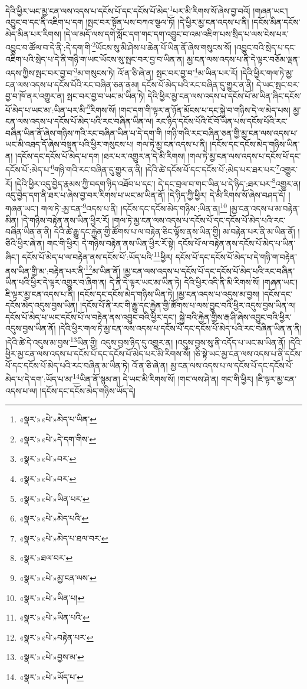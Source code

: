 དེའི་ཕྱིར་ཡང་མྱ་ངན་ལས་འདས་པ་དངོས་པོ་དང་དངོས་པོ་མེད་\footnote{«སྣར་»«པེ་»མེད་པ་ཡིན་}པར་མི་རིགས་སོ་ཞེས་བྱ་བའོ། །གཞན་ཡང་། འབྱུང་བ་དང་ནི་འཇིག་པ་དག །སྤང་བར་སྟོན་པས་བཀའ་སྩལ་ཏོ། །དེ་ཕྱིར་མྱ་ངན་འདས་པ་ནི། །དངོས་མིན་དངོས་མེད་མིན་པར་རིགས། །དེ་ལ་མདོ་ལས་དགེ་སློང་དག་གང་དག་འབྱུང་བ་འམ་འཇིག་པས་སྲིད་པ་ལས་ངེས་པར་འབྱུང་བ་ཚོལ་བ་དེ་ནི་:དེ་དག་གི་\footnote{«སྣར་»«པེ་»དེ་དག་གིས་}ཡོངས་སུ་མི་ཤེས་པ་ཆེན་པོ་ཡིན་ནོ་ཞེས་གསུངས་སོ། །འབྱུང་བའི་སྲེད་པ་དང་འཇིག་པའི་སྲེད་པ་དེ་ནི་གཉི་ག་ཡང་ཡོངས་སུ་སྤང་བར་བྱ་བ་ཡིན་ན། མྱ་ངན་ལས་འདས་པ་ནི་དེ་ལྟར་བཅོམ་ལྡན་འདས་ཀྱིས་སྤང་བར་བྱ་བ་\footnote{«སྣར་»«པེ་»བར་}མ་གསུངས་ཏེ། འོ་ན་ཅི་ཞེ་ན། སྤང་བར་བྱ་བ་\footnote{«སྣར་»«པེ་»བར་}མ་ཡིན་པར་རོ། །དེའི་ཕྱིར་གལ་ཏེ་མྱ་ངན་ལས་འདས་པ་དངོས་པོའི་རང་བཞིན་ཅན་ནམ། དངོས་པོ་མེད་པའི་རང་བཞིན་དུ་གྱུར་ན་ནི། དེ་ཡང་སྤང་བར་བྱ་བ་ཁོ་ནར་འགྱུར་ན། སྤང་བར་བྱ་བ་ཡང་མ་ཡིན་ཏེ། དེའི་ཕྱིར་མྱ་ངན་ལས་འདས་པ་དངོས་པོ་མ་ཡིན་ཞིང་དངོས་པོ་མེད་པ་ཡང་མ་:ཡིན་པར་མི་\footnote{«སྣར་»«པེ་»ཡིན་པར་}རིགས་སོ། །གང་དག་གི་ལྟར་ན་ཉོན་མོངས་པ་དང་སྐྱེ་བ་གཉིས་དེ་ལ་མེད་པས། མྱ་ངན་ལས་འདས་པ་དངོས་པོ་མེད་པའི་རང་བཞིན་ཡིན་ལ། རང་ཉིད་དངོས་པོའི་ངོ་བོ་ཡིན་པས་དངོས་པོའི་རང་བཞིན་ཡིན་ནོ་ཞེས་གཉིས་ཀའི་རང་བཞིན་ཡིན་པ་དེ་དག་གི །གཉི་གའི་རང་བཞིན་ཅན་གྱི་མྱ་ངན་ལས་འདས་པ་ཡང་མི་འཐད་དོ་ཞེས་བསྟན་པའི་ཕྱིར་གསུངས་པ། གལ་ཏེ་མྱ་ངན་འདས་པ་ནི། །དངོས་དང་དངོས་མེད་གཉིས་ཡིན་ན། །དངོས་དང་དངོས་པོ་མེད་པ་དག །ཐར་པར་འགྱུར་ན་དེ་མི་རིགས། །གལ་ཏེ་མྱ་ངན་ལས་འདས་པ་དངོས་པོ་དང་དངོས་པོ་:མེད་པ་\footnote{«སྣར་»«པེ་»མེད་པའི་}གཉི་གའི་རང་བཞིན་དུ་གྱུར་ན་ནི། །དེའི་ཚེ་དངོས་པོ་དང་དངོས་པོ་:མེད་པར་ཐར་པར་\footnote{«སྣར་»«པེ་»མེད་པ་ཐལ་བར་}འགྱུར་རོ། །དེའི་ཕྱིར་འདུ་བྱེད་རྣམས་ཀྱི་བདག་ཉིད་འཐོབ་པ་དང་། དེ་དང་བྲལ་བ་གང་ཡིན་པ་དེ་ཉིད་:ཐར་པར་\footnote{«སྣར་»ཐལ་བར་}འགྱུར་ན། འདུ་བྱེད་དག་ནི་ཐར་པ་ཞེས་བྱ་བར་རིགས་པ་ཡང་མ་ཡིན་ནོ། །དེ་ཉིད་ཀྱི་ཕྱིར། དེ་མི་རིགས་སོ་ཞེས་བཤད་དོ། །གཞན་ཡང་། གལ་ཏེ་:མྱ་ངན་\footnote{«སྣར་»«པེ་»མྱ་ངན་ལས་}འདས་པ་ནི། །དངོས་དང་དངོས་མེད་གཉིས་:ཡིན་ན།\footnote{«སྣར་»«པེ་»ཡིན་པ།} །མྱ་ངན་འདས་པ་མ་བརྟེན་མིན། །དེ་གཉིས་བརྟེན་ནས་ཡིན་ཕྱིར་རོ། །གལ་ཏེ་མྱ་ངན་ལས་འདས་པ་དངོས་པོ་དང་དངོས་པོ་མེད་པའི་རང་བཞིན་ཡིན་ན་ནི། དེའི་ཚེ་རྒྱུ་དང་རྐྱེན་གྱི་ཚོགས་པ་ལ་བརྟེན་ཅིང་ལྟོས་ནས་ཡིན་གྱི། མ་བརྟེན་པར་ནི་མ་ཡིན་ནོ། །ཅིའི་ཕྱིར་ཞེ་ན། གང་གི་ཕྱིར། དེ་གཉིས་བརྟེན་ནས་ཡིན་ཕྱིར་རོ་སྟེ། དངོས་པོ་ལ་བརྟེན་ནས་དངོས་པོ་མེད་པ་ཡིན་ཞིང་། དངོས་པོ་མེད་པ་ལ་བརྟེན་ནས་དངོས་པོ་:ཡོད་པའི་\footnote{«སྣར་»«པེ་»ཡིན་པའི་}ཕྱིར། དངོས་པོ་དང་དངོས་པོ་མེད་པ་དེ་གཉི་ག་བརྟེན་ནས་ཡིན་གྱི་མ་:བརྟེན་པར་ནི་\footnote{«སྣར་»«པེ་»བརྟེན་པར་}མ་ཡིན་ནོ། །མྱ་ངན་ལས་འདས་པ་དངོས་པོ་དང་དངོས་པོ་མེད་པའི་རང་བཞིན་ཡིན་པའི་ཕྱིར་དེ་ལྟར་འགྱུར་བ་ཞིག་ན། དེ་ནི་དེ་ལྟར་ཡང་མ་ཡིན་ཏེ། དེའི་ཕྱིར་འདི་ནི་མི་རིགས་སོ། །གཞན་ཡང་། ཇི་ལྟར་མྱ་ངན་འདས་པ་ནི། །དངོས་དང་དངོས་མེད་གཉིས་ཡིན་ཏེ། །མྱ་ངན་འདས་པ་འདུས་མ་བྱས། །དངོས་དང་དངོས་མེད་འདུས་བྱས་ཡིན། །དངོས་པོ་ནི་རང་གི་རྒྱུ་དང་རྐྱེན་གྱི་ཚོགས་པ་ལས་བྱུང་བའི་ཕྱིར་འདུས་བྱས་ཡིན་ལ། དངོས་པོ་མེད་པ་ཡང་དངོས་པོ་ལ་བརྟེན་ནས་འབྱུང་བའི་ཕྱིར་དང་། སྐྱེ་བའི་རྐྱེན་གྱིས་རྒ་ཤི་ཞེས་འབྱུང་བའི་ཕྱིར་འདུས་བྱས་ཡིན་ནོ། །དེའི་ཕྱིར་གལ་ཏེ་མྱ་ངན་ལས་འདས་པ་དངོས་པོ་དང་དངོས་པོ་མེད་པའི་རང་བཞིན་ཡིན་ན་ནི། །དེའི་ཚེ་དེ་འདུས་མ་བྱས་\footnote{«སྣར་»«པེ་»བྱས་མ་}ཡིན་གྱི། འདུས་བྱས་ཉིད་དུ་འགྱུར་ན། །འདུས་བྱས་སུ་ནི་འདོད་པ་ཡང་མ་ཡིན་ནོ། །དེའི་ཕྱིར་མྱ་ངན་ལས་འདས་པ་དངོས་པོ་དང་དངོས་པོ་མེད་པར་མི་རིགས་སོ། །ཅི་སྟེ་ཡང་མྱ་ངན་ལས་འདས་པ་ནི་དངོས་པོ་དང་དངོས་པོ་མེད་པའི་རང་བཞིན་མ་ཡིན་ཏེ། འོ་ན་ཅི་ཞེ་ན། མྱ་ངན་ལས་འདས་པ་ལ་དངོས་པོ་དང་དངོས་པོ་མེད་པ་དེ་དག་:ཡོད་པ་མ་\footnote{«སྣར་»«པེ་»ཡོད་པ་}ཡིན་ནོ་སྙམ་ན། དེ་ཡང་མི་རིགས་སོ། །གང་ལས་ཤེ་ན། གང་གི་ཕྱིར། །ཇི་ལྟར་མྱ་ངན་འདས་པ་ལ། །དངོས་དང་དངོས་མེད་གཉིས་ཡོད་དེ། 